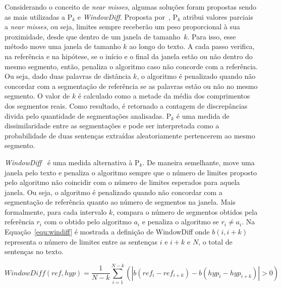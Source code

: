  

Considerando o conceito de \textit{near misses}, algumas soluções foram propostas sendo as mais utilizadas a P$_k$ e \textit{WindowDiff}. Proposta por~\cite{Beeferman1999}, P$_k$ atribui valores parciais a \textit{near misses}, ou seja, limites sempre receberão um peso proporcional à sua proximidade, desde que dentro de um janela de tamanho~$k$.  Para isso, esse método move uma janela de tamanho $k$ ao longo do texto.  A cada passo verifica, na referência e na hipótese, se o início e o final da janela estão ou não dentro do mesmo segmento, então, penaliza o algoritmo caso não concorde com a referência. Ou seja, dado duas palavras de distância $k$, o algoritmo é penalizado quando não concordar com a segmentação de referência se as palavras estão ou não no mesmo segmento.  O valor de $k$ é calculado como a metade da média dos comprimentos dos segmentos reais. Como resultado, é retornado a contagem de discrepâncias divida pelo quantidade de segmentações analisadas.  P$_k$ é uma medida de dissimilaridade entre as segmentações e pode ser interpretada como a probabilidade de duas sentenças extraídas aleatoriamente pertencerem ao mesmo segmento.  %




\textit{WindowDiff}~\cite{Pevzner2002} é uma medida alternativa à P$_k$. De maneira semelhante, move uma janela pelo texto e penaliza o algoritmo sempre que o número de limites proposto pelo algoritmo não coincidir com o número de limites esperados para aquela janela. Ou seja, o algoritmo é penalizado quando não concordar com a segmentação de referência quanto ao número de segmentos na janela. Mais formalmente, para cada intervalo $k$, compara o número de segmentos obtidos pela referência $r_i$ com o obtido pelo algoritmo $a_i$ e penaliza o algoritmo se $r_i \neq a_i$. Na Equação~\ref{equ:windiff} é mostrada a definição de WindowDiff onde $b(i, i+k)$ representa o número de limites entre as sentenças $i$ e $i+k$ e $N$, o total de sentenças no texto.

\begin{equation}
	WindowDiff(ref,hyp) = \frac{1}{N-k}\sum_{i=1}^{N-k}(|b(ref_i - ref_{i+k}) - b(hyp_i - hyp_{i+k})| > 0)
	\label{equ:windiff}
\end{equation}


